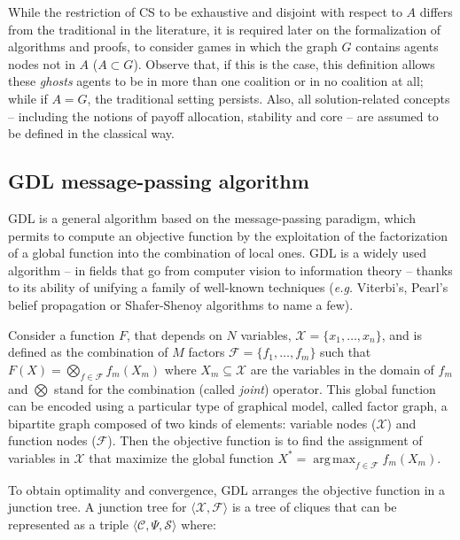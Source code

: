 \documentclass[11pt, twoside, titlepage, a4paper, openright]{report}
\begin{document}
\noindent While the restriction of CS to be exhaustive and disjoint with respect to $A$ differs from the traditional in the literature, it is required later on the formalization of algorithms and proofs, to consider games in which the graph $G$ contains agents nodes not in $A$ ($A \subset G$). Observe that, if this is the case, this definition allows these \textit{ghosts} agents to be in more than one coalition or in no coalition at all; while if $A = G$, the traditional setting persists. Also, all solution-related concepts -- including the notions of payoff allocation, stability and core -- are assumed to be defined in the classical way.

\subsection{GDL message-passing algorithm}\label{ref:gdlalgo}

GDL is a general algorithm based on the message-passing paradigm, which permits to compute an objective function by the exploitation of the factorization of a global function into the combination of local ones.
GDL is a widely used algorithm -- in fields that go from computer vision to information theory -- thanks to its ability of unifying a family of well-known techniques (\textit{e.g.} Viterbi's, Pearl's belief propagation or Shafer-Shenoy algorithms to name a few).

\noindent Consider a function $F$, that depends on $N$ variables, $\mathcal{X} = \{x_1,\ldots,x_n\}$, and is defined as the combination of $M$ factors $\mathcal{F}=\{f_1,\ldots,f_m\}$ such that $F(X) = \bigotimes_{f \in \mathcal{F}}f_m(X_m)$ where $X_m \subseteq \mathcal{X}$ are the variables in the domain of $f_m$ and $\bigotimes$ stand for the combination (called \textit{joint}) operator. This global function
can be encoded using a particular type of graphical model, called factor graph, a bipartite graph composed of two kinds of elements:
variable nodes ($\mathcal{X}$) and function nodes ($\mathcal{F}$). Then the objective function is to find the assignment of variables in $\mathcal{X}$ that maximize the global function
$X^* = \operatorname*{arg\,max}_{f \in \mathcal{F}} f_m (X_m)$.

\noindent To obtain optimality and convergence, GDL arranges the objective function in a junction tree. A junction tree for $\langle\mathcal{X},\mathcal{F}\rangle$ is a tree of cliques that can be represented as a triple $\langle\mathcal{C}, \Psi, \mathcal{S}\rangle$ where:
\end{document}
